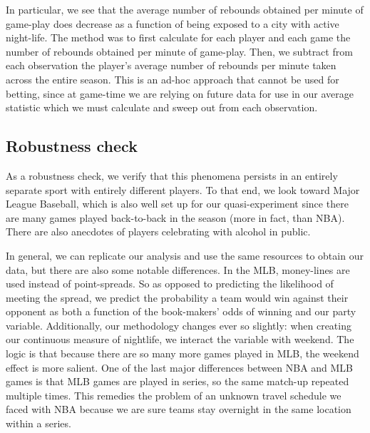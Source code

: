 \documentclass[letterpaper,12pt]{article}
\begin{document}
In particular, we see that the average number of rebounds obtained per minute
of game-play does decrease as a function of being exposed to a city with active night-life.
The method was to first calculate for each player and each game the number of rebounds obtained
per minute of game-play. Then, we subtract from each observation the player's average number of rebounds per minute taken across the entire season.
This is an ad-hoc approach that cannot be used for betting, since at game-time we are relying on future data for use in our average statistic which we must calculate and sweep out from each observation.


\subsection{Robustness check}
As a robustness check, we verify that this phenomena persists in an entirely separate
sport with entirely different players. To that end, we look toward
Major League Baseball, which is also well set up for our quasi-experiment since
there are many games played back-to-back in the season (more in fact, than NBA).
There are also anecdotes of players celebrating with alcohol in public.\cite{miller,campbell}

In general, we can replicate our analysis and use the same resources to obtain our data,
 but there are also some notable differences.
In the MLB, money-lines
are used instead of point-spreads. So as opposed to predicting
the likelihood of meeting the spread, we predict the probability
a team would win against their opponent as both a function of the book-makers'
odds of winning and our party variable. 
Additionally, our methodology changes ever so slightly: when creating our
continuous measure of nightlife, we interact the variable with weekend. The logic
is that because there are so many more games played in MLB, the weekend effect is more salient.
One of the last major differences between NBA and MLB games is that MLB games
are played in series, so the same match-up repeated multiple times. This remedies
the problem of an unknown travel schedule we faced with NBA because we are sure 
teams stay overnight in the same location within a series.
\end{document}
